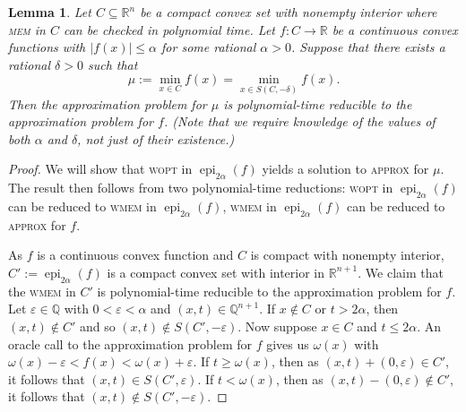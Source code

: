 \documentclass[11pt,reqno]{amsart}
\newtheorem{lemma}[theorem]{Lemma}
\theoremstyle{definition}
\theoremstyle{remark}
\begin{document}
\begin{lemma}\label{mincomput}
Let $C\subseteq \mathbb{R}^n$ be a compact convex set with nonempty interior where \textsc{mem}  in $C$ can be checked in polynomial time. Let $f:C \to \mathbb{R}$ be a continuous convex functions with $\lvert f(x) \rvert \le \alpha$ for some rational $\alpha > 0$.
Suppose that there exists a rational $\delta>0$ such that  
\begin{equation}\label{mindeltacond}
\mu:=\min_{x\in C} f(x)=\min_{x\in S(C,-\delta)} f(x) .
\end{equation}
Then the approximation problem for $\mu$ is polynomial-time reducible to the approximation problem for $f$. (Note that we require knowledge of the values of both $\alpha$ and $\delta$, not just of their existence.)
\end{lemma}
\begin{proof}
We will show that \textsc{wopt} in $\operatorname{epi}_{2\alpha}(f)$ yields a solution to \textsc{approx} for $\mu$. The result then follows from two polynomial-time reductions: \textsc{wopt} in $\operatorname{epi}_{2\alpha}(f)$ can be reduced to \textsc{wmem} in $\operatorname{epi}_{2\alpha}(f)$, \textsc{wmem} in $\operatorname{epi}_{2\alpha}(f)$ can be reduced to \textsc{approx} for $f$.

As $f$ is a continuous convex function and $C$ is compact with nonempty interior, $C' :=\operatorname{epi}_{2\alpha}(f)$ is a compact convex set with interior in $\mathbb{R}^{n+1}$.
We claim that the \textsc{wmem} in $C'$ is polynomial-time reducible to the approximation problem for $f$.  Let $\varepsilon\in \mathbb{Q}$ with $0 < \varepsilon < \alpha$  and $(x,t)\in\mathbb{Q}^{n+1}$. If $x\notin C$  or $t>2\alpha$, then $(x,t)\notin C'$ and so $(x,t)\notin S(C',-\varepsilon)$. Now suppose $x\in C$ and $t\le 2\alpha$. An oracle call to the approximation problem for $f$ gives us $\omega(x)$ with $\omega(x)-\varepsilon<f(x)<\omega(x)+\varepsilon$. If $t\ge \omega(x)$, then as $(x,t)+(0,\varepsilon)\in C'$, it follows 
that $(x,t)\in S(C',\varepsilon)$.  If $t<\omega(x)$, then as $(x,t)-(0,\varepsilon)\notin C'$, it follows that $(x,t)\notin S(C',-\varepsilon)$.


\end{proof}
\end{document}
